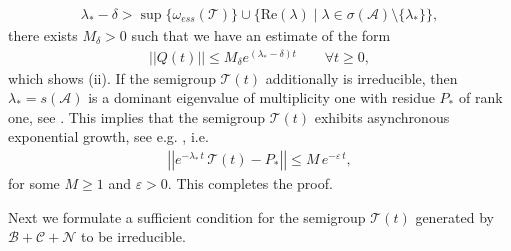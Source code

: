 \documentclass[12pt,a4paper]{amsart}
\newenvironment{proofof}[1]
{\smallskip\noindent{\textbf{Proof~of~#1.}}
\hspace{1pt}}{\hspace{-5pt}{\nobreak\nobreak\hfill\nobreak
$\square$\vspace{2pt}\par}\smallskip\goodbreak}
\begin{document}
\begin{proofof}{Theorem \ref{mainresult}}
\begin{align*}
    \lambda_*-\delta>\sup\{\omega_{ess}(\mathcal{T})\}\cup\{\mathrm{Re}(\lambda)\mid \lambda\in \sigma(\mathcal{A})\setminus\{\lambda_*\}\}, 
    \end{align*}
there exists $M_{\delta}>0$ such that we have an estimate of the form
    \begin{align*}
        ||Q(t)||\le M_\delta e^{(\lambda_*-\delta) t} \qquad \forall t\geq 0,
    \end{align*}
which shows (ii). If the semigroup $\mathcal{T}(t)$ additionally is irreducible, then $\lambda_*=s(\mathcal{A})$ is a dominant eigenvalue of multiplicity one with residue $P_*$ of rank one, see  \cite[C-III, Proposition 3.5]{Arendt}.
This implies that the semigroup $\mathcal{T}(t)$ exhibits asynchronous exponential growth, see e.g. \cite{Webb1987}, i.e.
\begin{align*}
    \left|\left|e^{-\lambda_*\,t}\,\mathcal{T}(t)-P_*\right|\right|\le M\,e^{-\varepsilon\,t},
    \end{align*}
for some $M\ge 1$ and $\varepsilon>0$. This completes the proof.
\end{proofof}

\noindent Next we formulate a sufficient condition for the semigroup $\mathcal{T}(t)$ generated by $\mathcal{B}+\mathcal{C}+\mathcal{N}$ to be irreducible. 
\end{document}
